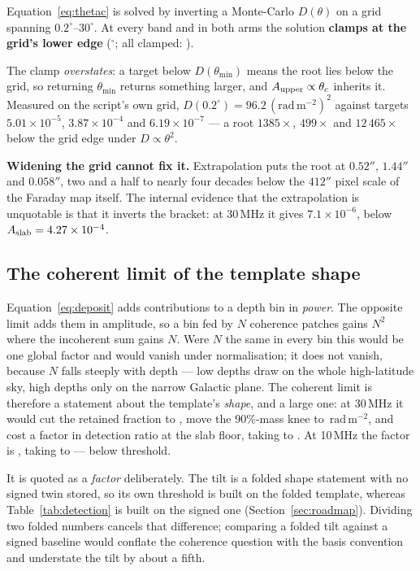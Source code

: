 \documentclass[11pt]{article}
\newcommand{\rmu}{\ensuremath{\mathrm{rad\,m^{-2}}}}
\begin{document}
Equation~\eqref{eq:thetac} is solved by inverting a Monte-Carlo
$D(\theta)$ on a grid spanning $0.2^\circ$--$30^\circ$. At every band
and in both arms the solution \textbf{clamps at the grid's lower edge}
(\thetaCDeg$^\circ$; all clamped: \thetaCAllClamped).

The clamp \emph{overstates}: a target below $D(\theta_{\min})$ means the
root lies below the grid, so returning $\theta_{\min}$ returns
something larger, and $A_{\rm upper}\propto\theta_c$ inherits it.
Measured on the script's own grid, $D(0.2^\circ) = 96.2\,(\rmu)^2$
against targets $5.01\times10^{-5}$, $3.87\times10^{-4}$ and
$6.19\times10^{-7}$ --- a root $1385\times$, $499\times$ and
$12\,465\times$ below the grid edge under $D\propto\theta^2$.

\textbf{Widening the grid cannot fix it.} Extrapolation puts the root
at $0.52''$, $1.44''$ and $0.058''$, two and a half to nearly four
decades below the $412''$ pixel scale of the Faraday map itself. The
internal evidence that the extrapolation is unquotable is that it
inverts the bracket: at 30\,MHz it gives $7.1\times10^{-6}$, below
$A_{\rm slab} = 4.27\times10^{-4}$.

\subsection{The coherent limit of the template shape}
\label{sec:tilt}

Equation~\eqref{eq:deposit} adds contributions to a depth bin in
\emph{power}. The opposite limit adds them in amplitude, so a bin fed
by $N$ coherence patches gains $N^2$ where the incoherent sum gains
$N$. Were $N$ the same in every bin this would be one global factor and
would vanish under normalisation; it does not vanish, because $N$ falls
steeply with depth --- low depths draw on the whole high-latitude sky,
high depths only on the narrow Galactic plane. The coherent limit is
therefore a statement about the template's \emph{shape}, and a large
one: at 30\,MHz it would cut the retained fraction to \tiltFracThirty,
move the 90\%-mass knee to \tiltKneeThirty\,\rmu, and cost a factor
\tiltFactorThirty{} in detection ratio at the slab floor, taking
\detSafeSlabThirty{} to \tiltAppliedThirty. At 10\,MHz the factor is
\tiltFactorTen, taking \detSafeSlabTen{} to \tiltAppliedTen{} ---
below threshold.

It is quoted as a \emph{factor} deliberately. The tilt is a folded
shape statement with no signed twin stored, so its own threshold is
built on the folded template, whereas
Table~\ref{tab:detection} is built on the signed one
(Section~\ref{sec:roadmap}). Dividing two folded numbers cancels that
difference; comparing a folded tilt against a signed baseline would
conflate the coherence question with the basis convention and
understate the tilt by about a fifth.
\end{document}
